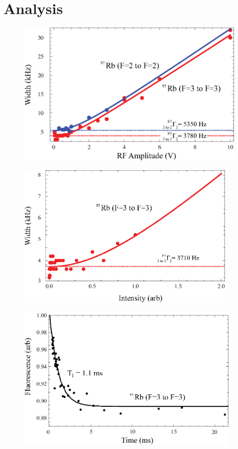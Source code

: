 
\section{Analysis}\label{analysis}


\begin{figure}[htbp]
\begin{center}
\includegraphics[height=70mm]{./figures/amp_width.eps}
\caption{\small{}}
\label{fig:}
\end{center}
\end{figure}

\begin{figure}[htbp]
\begin{center}
\includegraphics[height=70mm]{./figures/intensity_width.eps}
\caption{\small{}}
\label{fig:}
\end{center}
\end{figure}


\begin{figure}[htbp]
\begin{center}
\includegraphics[height=70mm]{./figures/T1.eps}
\caption{\small{}}
\label{fig:}
\end{center}
\end{figure}
